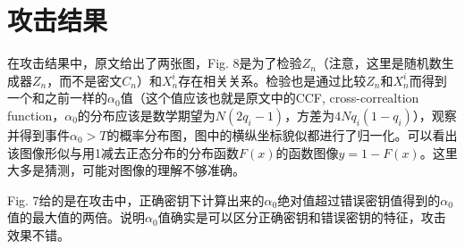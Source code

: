 \documentclass{article}
\begin{document}
\section{攻击结果}
在攻击结果中，原文给出了两张图，Fig. 8是为了检验$Z_n$（注意，这里是随机数生成器$Z_n$，而不是密文$C_n$）和$X_n^i$存在相关关系。检验也是通过比较$Z_n$和$X_n^i$而得到一个和之前一样的$\alpha_0$值（这个值应该也就是原文中的CCF, cross-correaltion function，$\alpha_0$的分布应该是数学期望为$N(2q_i-1)$，方差为$4Nq_i(1-q_i)$），观察并得到事件$\alpha_0>T$的概率分布图，图中的横纵坐标貌似都进行了归一化。可以看出该图像形似与用1减去正态分布的分布函数$F(x)$的函数图像$y=1-F(x)$。这里大多是猜测，可能对图像的理解不够准确。

Fig. 7给的是在攻击中，正确密钥下计算出来的$\alpha_0$绝对值超过错误密钥值得到的$\alpha_0$值的最大值的两倍。说明$\alpha_0$值确实是可以区分正确密钥和错误密钥的特征，攻击效果不错。
\end{document}
